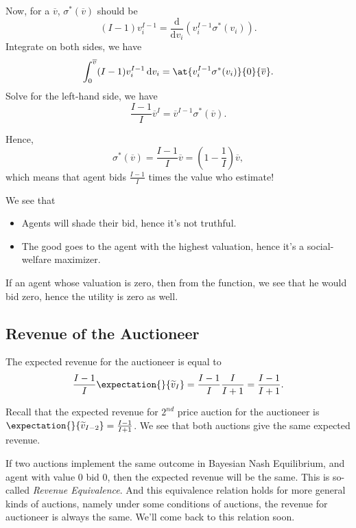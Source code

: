\par Now, for a \(\overline{v}\), \(\sigma^{\ast}(\overline{v})\) should be
\[
	(I - 1)v_{i}^{I-1} = \frac{\mathrm{d}}{\mathrm{d}v_{i}} \left(v_{i}^{I-1}\sigma^{\ast}(v_{i})\right).
\]
Integrate on both sides, we have
\[
	\int_0^{\overline{v}}(I - 1)v_{i}^{I-1}\,\mathrm{d} v_{i} = \at{v_{i}^{I-1}\sigma^{\ast}(v_{i})}{0}{\overline{v}}.
\]
Solve for the left-hand side, we have
\[
	\frac{I - 1}{I}\overline{v}^I = \overline{v}^{I-1}\sigma^{\ast}(\overline{v}).
\]

Hence,
\[
	\sigma^{\ast}(\overline{v}) = \frac{I-1}{I}\overline{v} = (1 - \frac{1}{I})\overline{v},
\]
which means that agent bids \(\frac{I - 1}{I}\) times the value who estimate!

\begin{note}
	We see that
	\begin{itemize}
		\item Agents will shade their bid, hence it's not truthful.
		\item The good goes to the agent with the highest valuation, hence it's a social-welfare maximizer.
	\end{itemize}
\end{note}

\begin{remark}
	If an agent whose valuation is zero, then from the function, we see that he would bid zero, hence the utility is zero as well.
\end{remark}

\subsection{Revenue of the Auctioneer}
The expected revenue for the auctioneer is equal to
\[
	\frac{I - 1}{I}\expectation{}{\widetilde{v}_I} = \frac{I - 1}{I}\frac{I}{I+1} = \frac{I - 1}{I+1}.
\]

\begin{remark}
	Recall that the expected revenue for \(2^{nd}\) price auction for the auctioneer is \(\expectation{}{\widetilde{v}_{I-2}} = \frac{I-1}{I+1}\).
	We see that both auctions give the same expected revenue.
\end{remark}

\begin{note}
	If two auctions implement the same outcome in Bayesian Nash Equilibrium, and agent with value \(0\) bid \(0\), then the expected
	revenue will be the same. This is so-called \emph{Revenue Equivalence}. And this equivalence relation holds for more general kinds of
	auctions, namely under some conditions of auctions, the revenue for auctioneer is always the same. We'll come back to this
	relation soon.
\end{note}

